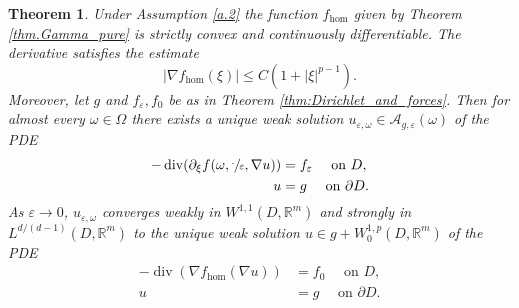 \documentclass[10pt]{amsart}
\DeclareMathOperator{\dive}{div}
\newtheorem{theorem}{Theorem}[section]
\theoremstyle{definition}
\let\e\varepsilon
\let\w\omega
\newcommand{\R}{\mathbb{R}}
\begin{document}
\begin{theorem}\label{thm.PDEs}
Under Assumption \ref{a.2} the function $f_{\hom}$ given by Theorem \ref{thm.Gamma_pure} is strictly convex and continuously differentiable. The derivative satisfies the estimate
\begin{equation*}
|\nabla f_{\hom}(\xi)|\leq C(1+|\xi|^{p-1}).
\end{equation*}
Moreover, let $g$ and $f_{\e},f_0$ be as in Theorem \ref{thm:Dirichlet_and_forces}. Then for almost every $\w\in\Omega$ there exists a unique weak solution $u_{\e,\w}\in \mathcal{A}_{g,\e}(\w)$ of the PDE
\begin{equation}\label{eq:epsPDE}
\begin{split}-\dive(\partial_{\xi }f(\w,\sfrac{\cdot}{\e},\nabla u))&=f_{\e}\quad\text{ on }D,
\\
u&=g\quad\text{ on }\partial D.
\end{split}
\end{equation}
As $\e\to 0$, $u_{\e,\w}$ converges weakly in $W^{1,1}(D,\R^m)$ and strongly in $L^{d/(d-1)}(D,\R^m)$ to the unique weak solution $u\in g+W^{1,p}_0(D,\R^m)$ of the PDE
\begin{align*}
-\dive(\nabla f_{\hom}(\nabla u))&=f_0\quad\text{ on }D,
\\
u&=g\quad\text{ on }\partial D.
\end{align*}
\end{theorem}
\end{document}
